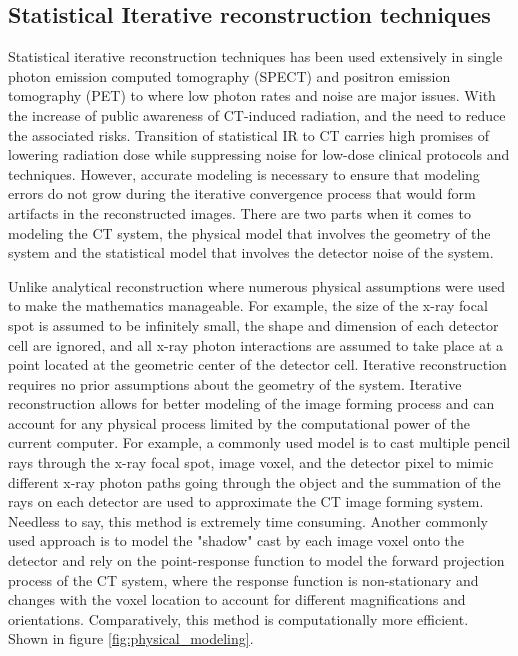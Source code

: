 \subsection{Statistical Iterative reconstruction techniques}
Statistical iterative reconstruction techniques has been used extensively in single photon emission computed tomography (SPECT) and positron emission tomography (PET) to where low photon rates and noise are major issues.  With the increase of public awareness of CT-induced radiation, and the need to reduce the associated risks. Transition of statistical IR to CT carries high promises of lowering radiation dose while suppressing noise for low-dose clinical protocols and techniques.  However, accurate modeling is necessary to ensure that modeling errors do not grow during the iterative convergence process that would form artifacts in the reconstructed images.  There are two parts when it comes to modeling the CT system, the physical model that involves the geometry of the system and the statistical model that involves the detector noise of the system.  

Unlike analytical reconstruction where numerous physical assumptions were used to make the mathematics manageable.  For example, the size of the x-ray focal spot is assumed to be infinitely small, the shape and dimension of each detector cell are ignored, and all x-ray photon interactions are assumed to take place at a point located at the geometric center of the detector cell.  Iterative reconstruction requires no prior assumptions about the geometry of the system.  Iterative reconstruction allows for better modeling of the image forming process and can account for any physical process limited by the computational power of the current computer.  For example, a commonly used model is to cast multiple pencil rays through the x-ray focal spot, image voxel, and the detector pixel to mimic different x-ray photon paths going through the object and the summation of the rays on each detector are used to approximate the CT image forming system. Needless to say, this method is extremely time consuming.  Another commonly used approach is to model the "shadow" cast by each image voxel onto the detector and rely on the point-response function to model the forward projection process of the CT system, where the response function is non-stationary and changes with the voxel location to account for different magnifications and orientations.  Comparatively, this method is computationally more efficient.  Shown in figure \ref{fig:physical_modeling}.

